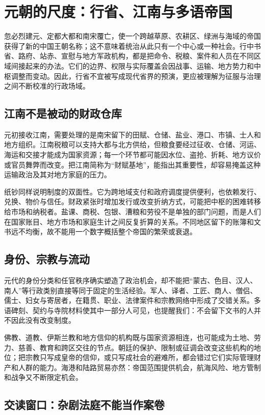 \section{元朝的尺度：行省、江南与多语帝国}

忽必烈建元、定都大都和南宋覆亡，使一个跨越草原、农耕区、绿洲与海域的帝国获得了新的中国王朝名称；这不意味着统治从此只有一个中心或一种社会。行中书省、路府、站赤、宣慰与地方军政机构，都是把命令、税粮、案件和人员在不同区域间接起来的办法。它们的边界、权限与实际覆盖会因战事、运输、地方势力和中枢调整而变动。因此，行省不宜被写成现代省界的预演，更应被理解为征服与治理之间不断校准的行政场域。

\subsection{江南不是被动的财政仓库}

元初接收江南，需要处理的是南宋留下的田赋、仓储、盐业、港口、市镇、士人和地方组织。江南税粮可以支持大都与北方供给，但粮食要经过征收、仓储、河运、海运和交接才能成为国家资源；每一个环节都可能因水位、盗抢、折耗、地方议价或官员舞弊而改变。把江南简称为“财赋基地”，能指出其重要性，却容易掩盖这种运输政治及其对地方家庭的压力。

纸钞同样说明制度的双面性。它为跨地域支付和政府调度提供便利，也依赖发行、兑换、物价与信任。财政紧张时增加发行或改变折纳方式，可能把中枢的困难转移给市场和纳税者。盐课、商税、包银、漕粮和劳役不是单独的部门问题，而是人们在国家账目、地方市场和家庭生计之间反复折算的关系。不同地区留下的账簿和文书远不均衡，故不能用一个数字概括整个帝国的繁荣或衰退。

\subsection{身份、宗教与流动}

元代的身份分类和任官秩序确实塑造了政治机会，却不能把“蒙古、色目、汉人、南人”等行政类别直接等同于固定的生活经验。军人、译者、工匠、商人、僧侣、儒士、妇女与寄居者，在籍贯、职业、法律案件和宗教网络中形成了交错关系。多语碑刻、契约与寺院材料使其中一部分人可见，也提醒我们：不会留下文书的人并不因此没有改变制度。

佛教、道教、伊斯兰教和地方信仰的机构既与国家资源相连，也可能成为土地、劳力、慈善、教育和跨区交往的节点。朝廷的保护、限制或征调会改变这些机构的地位；把宗教只写成皇帝的信仰，或只写成社会的避难所，都会错过它们实际管理财产和人群的能力。海港和陆路贸易亦然：帝国范围提供机会，航海风险、地方管制和战争又不断限定机会。

\subsection{交读窗口：杂剧法庭不能当作案卷}

